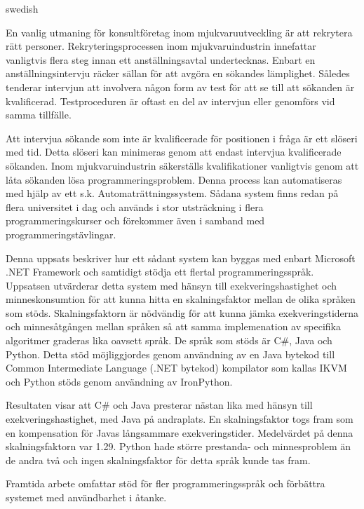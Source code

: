 \begin{foreignabstract}{swedish}

En vanlig utmaning för konsultföretag inom mjukvaruutveckling är att rekrytera rätt personer. Rekryteringsprocessen inom mjukvaruindustrin innefattar vanligtvis flera steg innan ett anställningsavtal undertecknas. Enbart en anställningsintervju räcker sällan för att avgöra en sökandes lämplighet. Således tenderar intervjun att involvera någon form av test för att se till att sökanden är kvalificerad. Testproceduren är oftast en del av intervjun eller genomförs vid samma tillfälle. 

Att intervjua sökande som inte är kvalificerade för positionen i fråga är ett slöseri med tid. Detta slöseri kan minimeras genom att endast intervjua kvalificerade sökanden. Inom mjukvaruindustrin säkerställs kvalifikationer vanligtvis genom att låta sökanden lösa programmeringsproblem. Denna process kan automatiseras med hjälp av ett s.k. Automaträttningssystem. Sådana system finns redan på flera universitet i dag och används i stor utsträckning i flera programmeringskurser och förekommer även i samband med programmeringstävlingar.

Denna uppsats beskriver hur ett sådant system kan byggas med enbart Microsoft .NET Framework och samtidigt stödja ett flertal programmeringsspråk. Uppsatsen utvärderar detta system med hänsyn till exekveringshastighet och minneskonsumtion för att kunna hitta en skalningsfaktor mellan de olika språken som stöds. Skalningsfaktorn är nödvändig för att kunna jämka exekveringstiderna och minnesåtgången mellan språken så att samma implemenation av specifika algoritmer graderas lika oavsett språk. De språk som stöds är C\#, Java och Python. Detta stöd möjliggjordes genom användning av en Java bytekod till Common Intermediate Language (.NET bytekod) kompilator som kallas IKVM och Python stöds genom användning av IronPython.

Resultaten visar att C\# och Java presterar nästan lika med hänsyn till exekveringshastighet, med Java på andraplats. En skalningsfaktor togs fram som en kompensation för Javas långsammare exekveringstider. Medelvärdet på denna skalningsfaktorn var 1.29. Python hade större prestanda- och minnesproblem än de andra två och ingen skalningsfaktor för detta språk kunde tas fram.

Framtida arbete omfattar stöd för fler programmeringsspråk och förbättra systemet med användbarhet i åtanke.

\end{foreignabstract}
